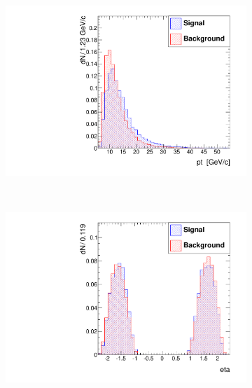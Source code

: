 \documentclass[10pt,a4paper]{article}
\begin{document}
\begin{figure}
        \centering
        \begin{subfigure}[b]{0.2\textwidth}
                \centering
                \includegraphics[width=\textwidth]{Figures/pt_endcaps}
                \label{fig:ptEndcaps}
        \end{subfigure}
        ~
        \begin{subfigure}[b]{0.2\textwidth}
                \centering
	            \includegraphics[width=\textwidth]{Figures/eta_endcaps}
                \label{fig:etaEndcaps}
        \end{subfigure}
        ~
        \begin{subfigure}[b]{0.2\textwidth}

\end{subfigure}
\end{figure}
\end{document}
